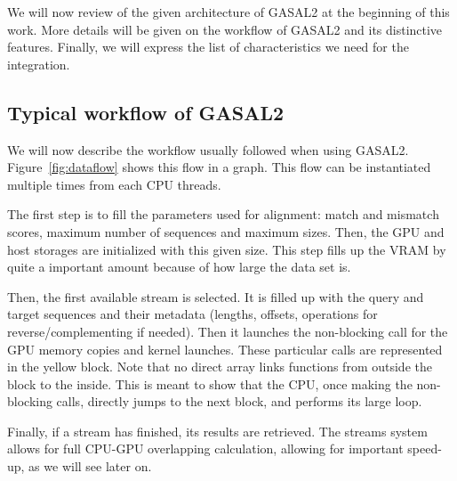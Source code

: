 We will now review of the given architecture of GASAL2 at the beginning of this work. More details will be given on the workflow of GASAL2 and its distinctive features. Finally, we will express the list of characteristics we need for the integration.


\subsection{Typical workflow of GASAL2}

We will now describe the workflow usually followed when using GASAL2. Figure~\ref{fig:dataflow} shows this flow in a graph. This flow can be instantiated multiple times from each CPU threads.

The first step is to fill the parameters used for alignment: match and mismatch scores, maximum number of sequences and maximum sizes. Then, the GPU and host storages are initialized with this given size. This step fills up the VRAM by quite a important amount because of how large the data set is. 

Then, the first available stream is selected. It is filled up with the query and target sequences and their metadata (lengths, offsets, operations for reverse/complementing if needed). Then it launches the non-blocking call for the GPU memory copies and kernel launches. These particular calls are represented in the yellow block. Note that no direct array links functions from outside the block to the inside. This is meant to show that the CPU, once making the non-blocking calls, directly jumps to the next block, and performs its large loop.

Finally, if a stream has finished, its results are retrieved. The streams system allows for full CPU-GPU overlapping calculation, allowing for important speed-up, as we will see later on.

